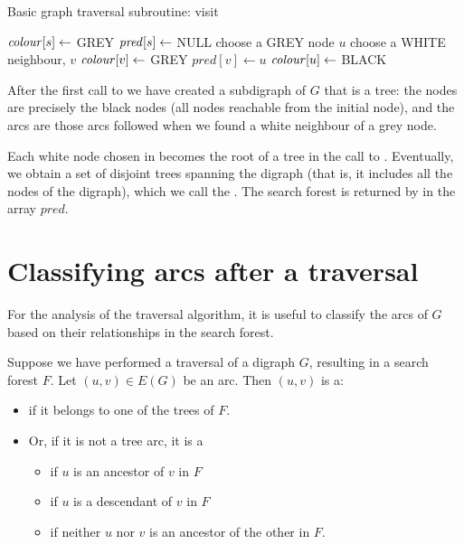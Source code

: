 \begin{algorithm}[H]
  \caption{Basic graph traversal subroutine: visit
    \label{alg:visit}}
\begin{algorithmic}[1]
	\State  $\operatorname{\text{\textit{colour}}}[s] \gets$ GREY 
	\State $\operatorname{\text{\textit{pred}}}[s] \gets$ NULL 
	 
	\State choose a GREY node $u$ 
	\State choose a WHITE neighbour, $v$ 
	\State $\operatorname{\text{\textit{colour}}}[v] \gets $ GREY 
	\State $pred[v] \gets u$ 
	\Else
	\State $\operatorname{\text{\textit{colour}}}[u] \gets $ BLACK 
	\EndIf
	\EndWhile
\EndFunction
\end{algorithmic}
\end{algorithm}

After the first call to  we have created a subdigraph of $G$ that is a tree: the
nodes are precisely the black nodes (all nodes reachable from the initial node), and the arcs are those arcs followed when we found a white neighbour of a grey node. 

Each white node chosen in  becomes the root of a tree in the call to . Eventually, we obtain a
set of disjoint trees spanning the digraph (that is, it includes all the nodes of the digraph), which we call the
. The search forest  is returned by  in the array $pred$.

 

\section{Classifying arcs after a traversal}

For the analysis of the traversal algorithm, it is useful to classify the arcs of $G$ based on their relationships in the search forest.  

\begin{Definition}\label{defn:arc-types}
Suppose we have performed a traversal of a digraph $G$, resulting in a
search forest $F$.  Let $(u, v)\in E(G)$ be an arc. Then $(u, v)$ is a:
\begin{itemize} 
\item {} if it belongs to one of the trees of $F$. 
\item Or, if it is not a tree arc, it is a
\begin{itemize}
\item {} if $u$ is an ancestor of $v$ in $F$
\item {} if $u$ is a descendant of $v$ in $F$
\item {} if neither $u$ nor $v$ is an ancestor of the other in $F$.
\end{itemize}
\end{itemize}
\end{Definition} 


